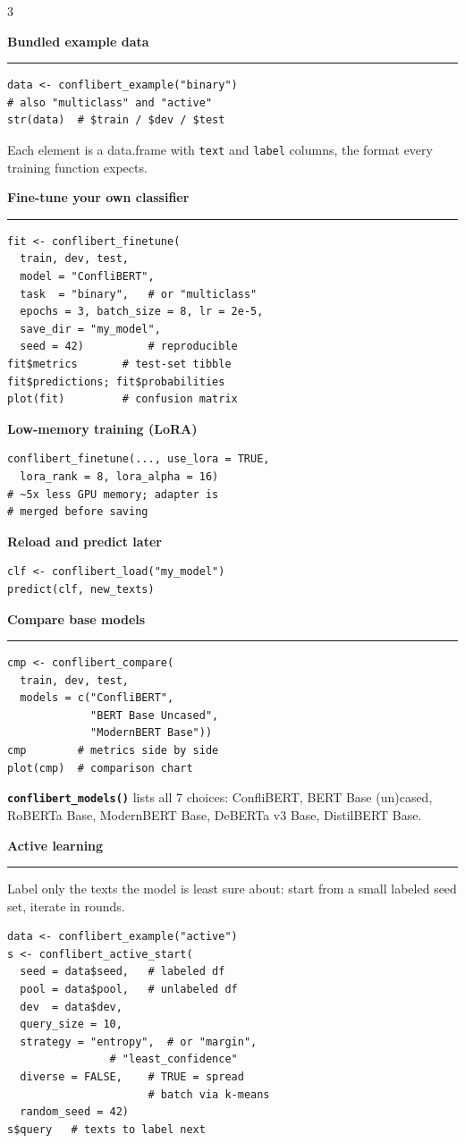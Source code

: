 \documentclass[8pt]{extarticle}
\newcommand{\cbsection}[1]{%
  \vspace{5pt}%
  {\color{cbnavy}\large\bfseries #1\par}\nointerlineskip\vspace{2.5pt}%
  {\color{cbamber}\rule{\linewidth}{1.6pt}\par}\vspace{2pt}%
}
\newcommand{\cbsub}[1]{{\color{cbred}\bfseries #1}\par}
\newcommand{\fn}[1]{\texttt{\bfseries\color{cbnavy}#1}}
\begin{document}
\begin{multicols}{3}
\columnbreak
\cbsection{Bundled example data}
\begin{lstlisting}
data <- conflibert_example("binary")
# also "multiclass" and "active"
str(data)  # $train / $dev / $test
\end{lstlisting}
Each element is a data.frame with \texttt{text} and \texttt{label} columns, the format every training function expects.

\cbsection{Fine-tune your own classifier}
\begin{lstlisting}
fit <- conflibert_finetune(
  train, dev, test,
  model = "ConfliBERT",
  task  = "binary",   # or "multiclass"
  epochs = 3, batch_size = 8, lr = 2e-5,
  save_dir = "my_model",
  seed = 42)          # reproducible
fit$metrics       # test-set tibble
fit$predictions; fit$probabilities
plot(fit)         # confusion matrix
\end{lstlisting}

\cbsub{Low-memory training (LoRA)}
\begin{lstlisting}
conflibert_finetune(..., use_lora = TRUE,
  lora_rank = 8, lora_alpha = 16)
# ~5x less GPU memory; adapter is
# merged before saving
\end{lstlisting}

\cbsub{Reload and predict later}
\begin{lstlisting}
clf <- conflibert_load("my_model")
predict(clf, new_texts)
\end{lstlisting}

\cbsection{Compare base models}
\begin{lstlisting}
cmp <- conflibert_compare(
  train, dev, test,
  models = c("ConfliBERT",
             "BERT Base Uncased",
             "ModernBERT Base"))
cmp        # metrics side by side
plot(cmp)  # comparison chart
\end{lstlisting}
\fn{conflibert\_models()} lists all 7 choices: ConfliBERT, BERT Base (un)cased, RoBERTa Base, ModernBERT Base, DeBERTa v3 Base, DistilBERT Base.

\columnbreak
\cbsection{Active learning}
Label only the texts the model is least sure about: start from a small labeled seed set, iterate in rounds.
\begin{lstlisting}
data <- conflibert_example("active")
s <- conflibert_active_start(
  seed = data$seed,   # labeled df
  pool = data$pool,   # unlabeled df
  dev  = data$dev,
  query_size = 10,
  strategy = "entropy",  # or "margin",
                # "least_confidence"
  diverse = FALSE,    # TRUE = spread
                      # batch via k-means
  random_seed = 42)
s$query   # texts to label next
\end{lstlisting}


\end{multicols}
\end{document}
